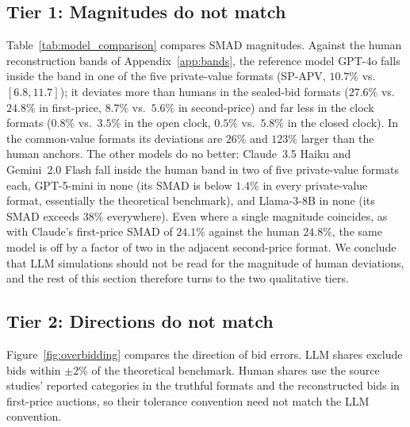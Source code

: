 \documentclass{article} %
\newif\ifmarkrev
\newcommand{\rev}[1]{\ifmarkrev\begingroup\color{red}#1\endgroup\else#1\fi}
\begin{document}
\subsection{\texorpdfstring{\rev{Tier 1: Magnitudes do not match}}{Tier 1: Magnitudes do not match}}\label{sec:tier_magnitudes}

\rev{Table~\ref{tab:model_comparison} compares SMAD magnitudes. Against the human reconstruction bands of Appendix~\ref{app:bands}, the reference model GPT-4o falls inside the band in one of the five private-value formats (SP-APV, $10.7\%$ vs.\ $[6.8, 11.7]$); it deviates more than humans in the sealed-bid formats ($27.6\%$ vs.\ $24.8\%$ in first-price, $8.7\%$ vs.\ $5.6\%$ in second-price) and far less in the clock formats ($0.8\%$ vs.\ $3.5\%$ in the open clock, $0.5\%$ vs.\ $5.8\%$ in the closed clock). In the common-value formats its deviations are $26\%$ and $123\%$ larger than the human anchors. The other models do no better: Claude~3.5 Haiku and Gemini~2.0 Flash fall inside the human band in two of five private-value formats each, GPT-5-mini in none (its SMAD is below $1.4\%$ in every private-value format, essentially the theoretical benchmark), and Llama-3-8B in none (its SMAD exceeds $38\%$ everywhere). Even where a single magnitude coincides, as with Claude's first-price SMAD of $24.1\%$ against the human $24.8\%$, the same model is off by a factor of two in the adjacent second-price format. We conclude that LLM simulations should not be read for the magnitude of human deviations, and the rest of this section therefore turns to the two qualitative tiers.}

\subsection{\texorpdfstring{\rev{Tier 2: Directions do not match}}{Tier 2: Directions do not match}}\label{sec:tier_directions}

\rev{Figure~\ref{fig:overbidding} compares the direction of bid errors. LLM shares exclude bids within $\pm 2\%$ of the theoretical benchmark. Human shares use the source studies' reported categories in the truthful formats and the reconstructed bids in first-price auctions, so their tolerance convention need not match the LLM convention.}
\end{document}
